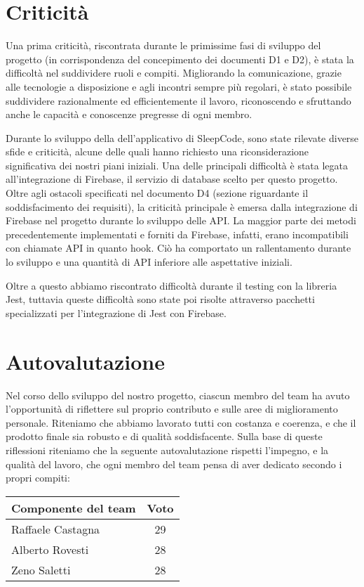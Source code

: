 \documentclass[11pt, a4paper]{article}
\theoremstyle{definition}
\begin{document}
\section{Criticità}
Una prima criticità, riscontrata durante le primissime fasi di sviluppo del progetto (in corrispondenza del concepimento dei documenti D1 e D2),
è stata la difficoltà nel suddividere ruoli e compiti.
Migliorando la comunicazione, grazie alle tecnologie a disposizione
e agli incontri sempre più regolari, è stato possibile suddividere
razionalmente ed efficientemente il lavoro, riconoscendo e sfruttando
anche le capacità e conoscenze pregresse di ogni membro.

Durante lo sviluppo della dell’applicativo di SleepCode, sono state rilevate diverse sfide e criticità, alcune delle quali hanno richiesto una riconsiderazione significativa dei nostri piani iniziali. Una delle principali difficoltà è stata legata all'integrazione di Firebase, il servizio di database scelto per questo progetto.
Oltre agli ostacoli specificati nel documento D4 (sezione riguardante il soddisfacimento dei requisiti),
la criticità principale è emersa dalla integrazione di Firebase nel progetto durante lo sviluppo delle API. La maggior parte dei metodi precedentemente implementati e forniti da Firebase, infatti, erano incompatibili con chiamate API in quanto hook. Ciò ha comportato un rallentamento durante lo sviluppo e una quantità di API inferiore alle aspettative iniziali.

Oltre a questo abbiamo riscontrato difficoltà durante il testing con la libreria Jest, tuttavia queste difficoltà sono state poi risolte attraverso pacchetti specializzati per l’integrazione di Jest con Firebase.


\section{Autovalutazione}
Nel corso dello sviluppo del nostro progetto, ciascun membro del team ha avuto l'opportunità di riflettere sul proprio contributo e sulle aree di miglioramento personale. Riteniamo che abbiamo lavorato tutti con costanza e coerenza, e che il prodotto finale sia robusto e di qualità soddisfacente.
Sulla base di queste riflessioni riteniamo che la seguente autovalutazione rispetti l’impegno, e la qualità del lavoro, che ogni membro del team pensa di aver dedicato secondo i propri compiti:

\begin{center}
    \begin{tabularx}{0.5\textwidth}{|X||c|}
        \hline
        \cellcolor{red!70}Componente del team & \cellcolor{red!70}Voto\\
        \hline
        Raffaele Castagna & 29\\
        \hline
        Alberto Rovesti & 28\\
        \hline
        Zeno Saletti & 28\\
        \hline
    \end{tabularx}
\end{center}
\end{document}
